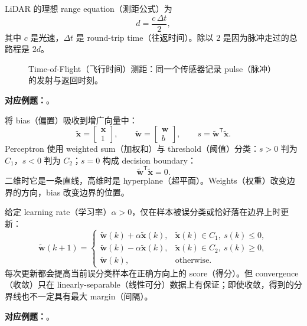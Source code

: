 LiDAR 的理想 range equation（测距公式）为
\[
  \boxed{d=\frac{c\,\Delta t}{2}},
\]
其中 $c$ 是光速，$\Delta t$ 是 round-trip time（往返时间）。除以 $2$ 是因为脉冲走过的总路程是 $2d$。

\begin{figure}[htbp]
  \centering
  \resizebox{0.82\textwidth}{!}{}
  \caption{Time-of-Flight（飞行时间）测距：同一个传感器记录 pulse（脉冲）的发射与返回时刻。}
  \label{fig:sc4061-l02-tof}
\end{figure}

\textbf{对应例题：}。


将 bias（偏置）吸收到增广向量中：
\[
  \tilde{\bm x}=\begin{bmatrix}\bm x\\1\end{bmatrix},
  \qquad
  \tilde{\bm w}=\begin{bmatrix}\bm w\\b\end{bmatrix},
  \qquad
  s=\tilde{\bm w}^{\mathsf T}\tilde{\bm x}.
\]
Perceptron 使用 weighted sum（加权和）与 threshold（阈值）分类：$s>0$ 判为 $C_1$，$s<0$ 判为 $C_2$；$s=0$ 构成 decision boundary：
\[
  \boxed{\tilde{\bm w}^{\mathsf T}\tilde{\bm x}=0}.
\]
二维时它是一条直线，高维时是 hyperplane（超平面）。Weights（权重）改变边界的方向，bias 改变边界的位置。


给定 learning rate（学习率）$\alpha>0$，仅在样本被误分类或恰好落在边界上时更新：
\[
\tilde{\bm w}(k+1)=
\begin{cases}
\tilde{\bm w}(k)+\alpha\tilde{\bm x}(k),
  & \tilde{\bm x}(k)\in C_1,\ s(k)\le 0,\\
\tilde{\bm w}(k)-\alpha\tilde{\bm x}(k),
  & \tilde{\bm x}(k)\in C_2,\ s(k)\ge 0,\\
\tilde{\bm w}(k), & \text{otherwise}.
\end{cases}
\]
每次更新都会提高当前误分类样本在正确方向上的 score（得分）。但 convergence（收敛）只在 linearly-separable（线性可分）数据上有保证；即使收敛，得到的分界线也不一定具有最大 margin（间隔）。

\textbf{对应例题：}。

\newpage
{}

